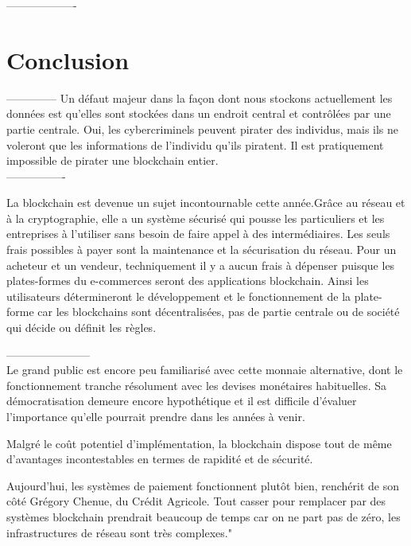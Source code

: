 \documentclass[12pt]{report}
\begin{document}
-------------------


\newpage		
\section{Conclusion}

\hspace{1cm} 

--------------
Un défaut majeur dans la façon dont nous stockons actuellement les données est qu’elles sont stockées dans un endroit central et contrôlées par une partie centrale. Oui, les cybercriminels peuvent pirater des individus, mais ils ne voleront que les informations de l’individu qu’ils piratent. Il est pratiquement impossible de pirater une blockchain entier.\\
----------------

\hspace{1cm} La blockchain est devenue un sujet incontournable cette année.Grâce au réseau et à la cryptographie, elle a un système sécurisé qui pousse les particuliers et les entreprises à l'utiliser sans besoin de faire appel à des intermédiaires. Les seuls frais possibles à payer sont la maintenance et la sécurisation du réseau. Pour un acheteur et un vendeur, techniquement il y a aucun frais à dépenser puisque les plates-formes du e-commerces seront des applications blockchain. Ainsi les utilisateurs détermineront le développement et le fonctionnement de la plate-forme car les blockchains sont décentralisées, pas de partie centrale ou de société qui décide ou définit les règles.\\

\hspace{1cm} 

-----------------------\\



Le grand public est encore peu familiarisé avec cette monnaie alternative, dont le fonctionnement tranche résolument avec les devises monétaires habituelles. Sa démocratisation demeure encore hypothétique et il est difficile d’évaluer l’importance qu’elle pourrait prendre dans les années à venir.

Malgré le coût potentiel d'implémentation, la blockchain dispose tout de même d'avantages incontestables en termes de rapidité et de sécurité.

Aujourd'hui, les systèmes de paiement fonctionnent plutôt bien, renchérit de son côté Grégory Chenue, du Crédit Agricole. Tout casser pour remplacer par des systèmes blockchain prendrait beaucoup de temps car on ne part pas de zéro, les infrastructures de réseau sont très complexes."
\end{document}
